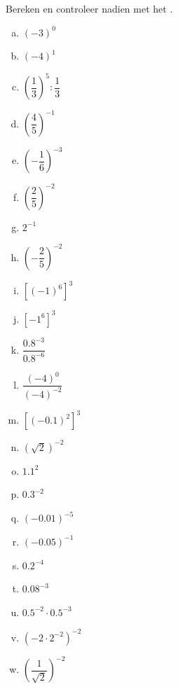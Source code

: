 \documentclass[12pt,twoside,a4paper]{article}
\begin{document}
\begin{oefening}
Bereken en controleer nadien met het .
\begin{multicols}{3}
\begin{enumerate}[(a)]
  \itemsep1em
  \item $\left(-3\right)^0$
  \item $\left(-4\right)^1$
  \item $\left(\dfrac{1}{3}\right)^5:\dfrac{1}{3}$
  \item $\left(\dfrac{4}{5}\right)^{-1}$
  \item $\left(-\dfrac{1}{6}\right)^{-3}$
  \item $\left(\dfrac{2}{5}\right)^{-2}$
  \item $2^{-1}$
  \item $\left(-\dfrac{2}{5}\right)^{-2}$
  \item $\left[\left(-1\right)^6\right]^3$
  \item $[-1^6]^3$
  \item $\dfrac{0.8^{-3}}{0.8^{-6}}$
  \item $\dfrac{\left(-4\right)^{0}}{\left(-4\right)^{-2}}$
  \item $\left[\left(-0.1\right)^2\right]^3$
  \item $\left(\sqrt{2}\right)^{-2}$
  \item $1.1^2$
  \item $0.3^{-2}$
  \item $\left(-0.01\right)^{-5}$
  \item $\left(-0.05\right)^{-1}$
  \item $0.2^{-4}$
  \item $0.08^{-3}$
  \item $0.5^{-2}\cdot0.5^{-3}$
  \item $\left(-2\cdot2^{-2}\right)^{-2}$
  \item $\left(\dfrac{1}{\sqrt{2}}\right)^{-2}$
\end{enumerate}
\end{multicols}
\end{oefening}
\end{document}
